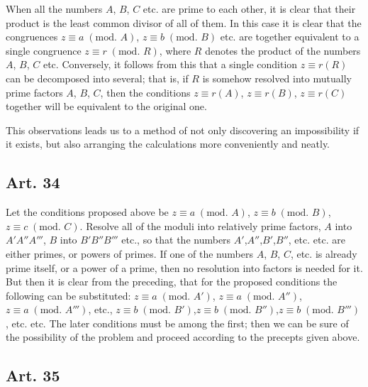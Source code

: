 \documentclass{book}
\theoremstyle{plain}
\theoremstyle{remark}
\begin{document}
When all the numbers $A$, $B$, $C$ etc. are prime to each other, it is clear that their product is the least common divisor of all of them.  In this case it is clear that the congruences $z \equiv a\;(\textrm{mod. }A)$, $z \equiv b \;(\textrm{mod. } B)$ etc. are together equivalent to a single congruence $z \equiv r\; (\textrm{mod. }R)$, where $R$ denotes the product of the numbers $A$, $B$, $C$ etc.  Conversely, it follows from this that a single condition $z \equiv r (R)$ can be decomposed into several; that is, if $R$ is somehow resolved into mutually prime factors $A$, $B$, $C$, then the conditions $z\equiv r(A)$, $z \equiv r (B)$, $z \equiv r (C)$ together will be equivalent to the original one.

This observations leads us to a method of not only discovering an impossibility if it exists, but also arranging the calculations more conveniently and neatly.

\subsection*{Art. 34}

Let the conditions proposed above be $z \equiv a \;(\textrm{mod. }A)$, $z \equiv b \;(\textrm{mod. }B)$, $z \equiv c \;(\textrm{mod. }C)$.   Resolve all of the moduli into relatively prime factors, $A$ into $A'A''A'''$, $B$ into $B'B''B'''$ etc., so that the numbers $A'$,$A''$,$B'$,$B''$, etc. etc. are either primes, or powers of primes.    If one of the numbers $A$, $B$, $C$, etc. is already prime itself, or a power of a prime, then no resolution into factors is needed for it.   But then it is clear from the preceding, that for the proposed conditions the following can be substituted: $z \equiv a \;(\textrm{mod. }A')$, $z \equiv a \;(\textrm{mod. }A'')$, $z \equiv a \;(\textrm{mod. }A''')$, etc., $z \equiv b \;(\textrm{mod. }B')$,$z \equiv b \;(\textrm{mod. }B'')$,$z \equiv b \;(\textrm{mod. }B''')$, etc. etc.  The later conditions must be among the first; then we can be sure of the possibility of the problem and proceed according to the precepts given above.

\subsection*{Art. 35}
\end{document}
